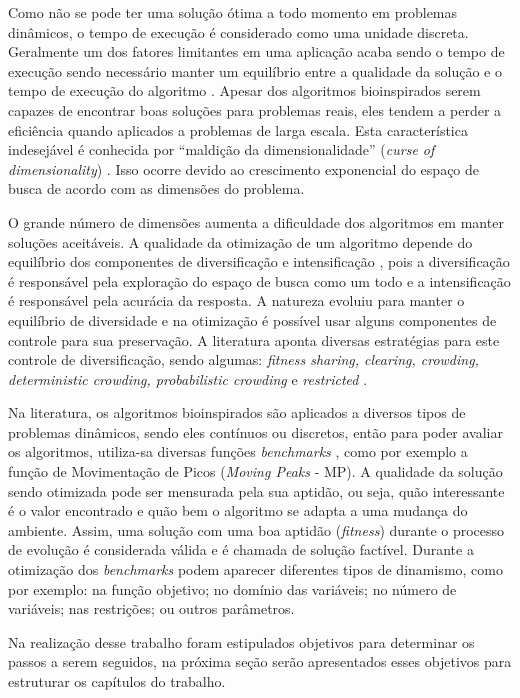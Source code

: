 Como não se pode ter uma solução ótima a todo momento em problemas dinâmicos, o tempo de execução é considerado como uma unidade discreta. Geralmente um dos fatores limitantes em uma aplicação acaba sendo o tempo de execução sendo necessário manter um equilíbrio entre a qualidade da solução e o tempo de execução do algoritmo \cite{li2006new}. Apesar dos algoritmos bioinspirados serem capazes de encontrar boas soluções para problemas reais, eles tendem a perder a eficiência quando aplicados a problemas de larga escala. Esta característica indesejável é conhecida por “maldição da dimensionalidade” (\textit{curse of dimensionality}) \cite{bellman2015applied}. Isso ocorre devido ao crescimento exponencial do espaço de busca de acordo com as dimensões do problema.

O grande número de dimensões aumenta a dificuldade dos algoritmos em manter soluções aceitáveis. A qualidade da otimização de um algoritmo depende do equilíbrio dos componentes de diversificação e intensificação \cite{boussaid2013survey}, pois a diversificação é responsável pela exploração do espaço de busca como um todo e a intensificação é responsável pela acurácia da resposta. A natureza evoluiu para manter o equilíbrio de diversidade e na otimização é possível usar alguns componentes de controle para sua preservação. A literatura aponta diversas estratégias para este controle de diversificação, sendo algumas: \textit{fitness sharing, clearing, crowding, deterministic crowding, probabilistic crowding} e \textit{restricted} \cite{andre2015multiple}.

Na literatura, os algoritmos bioinspirados são aplicados a diversos tipos de problemas dinâmicos, sendo eles contínuos ou discretos, então para poder avaliar os algoritmos, utiliza-sa diversas funções \textit{benchmarks} \cite{moser2007review}, como por exemplo a função de Movimentação de Picos (\textit{Moving Peaks} - MP). A qualidade da solução sendo otimizada pode ser mensurada pela sua aptidão, ou seja, quão interessante é o valor encontrado e quão bem o algoritmo se adapta a uma mudança do ambiente. Assim, uma solução com uma boa aptidão (\textit{fitness}) durante o processo de evolução é considerada válida e é chamada de solução factível. Durante a otimização dos \textit{benchmarks} podem aparecer diferentes tipos de dinamismo, como por exemplo: na função objetivo; no domínio das variáveis; no número de variáveis; nas restrições; ou outros parâmetros.

Na realização desse trabalho foram estipulados objetivos para determinar os passos a serem seguidos, na próxima seção serão apresentados esses objetivos para estruturar os capítulos do trabalho.	

